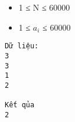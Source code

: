 \begin{itemize}
	\item     1 ≤ N ≤ 60000   
	\item     1 ≤ $a_{i}$    ≤ 60000   
\end{itemize}
\begin{verbatim}
Dữ liệu:
3
3
1
2

Kết qủa
2
\end{verbatim}